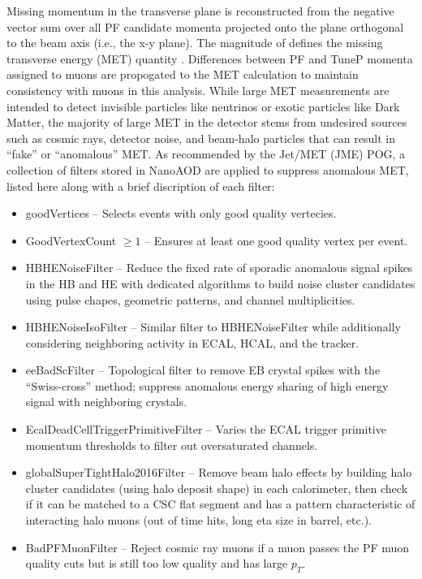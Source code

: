Missing momentum in the transverse plane \ptvecmiss is reconstructed from the negative vector sum over all PF candidate momenta projected onto the plane orthogonal to the beam axis (i.e., the x-y plane). The magnitude of \ptvecmiss defines the missing transverse energy (MET) quantity \MET. Differences between PF and TuneP momenta assigned to muons are propogated to the MET calculation to maintain consistency with muons in this analysis. While large MET measurements are intended to detect invisible particles like neutrinos or exotic particles like Dark Matter, the majority of large MET in the detector stems from undesired sources such as cosmic rays, detector noise, and beam-halo particles that can result in ``fake'' or ``anomalous'' MET. As recommended by the Jet/MET (JME) POG, a collection of filters stored in NanoAOD are applied to suppress anomalous MET, listed here along with a brief discription of each filter:

\begin{itemize}
    \item {goodVertices} -- Selects events with only good quality vertecies.
    \item {GoodVertexCount} $\geq 1$ -- Ensures at least one good quality vertex per event.
    \item {HBHENoiseFilter} -- Reduce the fixed rate of sporadic anomalous signal spikes in the HB and HE with dedicated algorithms to build noise cluster candidates using pulse chapes, geometric patterns, and channel multiplicities.
    \item {HBHENoiseIsoFilter} -- Similar filter to HBHENoiseFilter while additionally considering neighboring activity in ECAL, HCAL, and the tracker.
    \item {eeBadScFilter} -- Topological filter to remove EB crystal spikes with the ``Swiss-cross'' method; suppress anomalous energy sharing of high energy signal with neighboring crystals.
    \item {EcalDeadCellTriggerPrimitiveFilter} -- Varies the ECAL trigger primitive momentum thresholds to filter out oversaturated channels.
    \item {globalSuperTightHalo2016Filter} -- Remove beam halo effects by building halo cluster candidates (using halo deposit shape) in each calorimeter, then check if it can be matched to a CSC flat segment and has a pattern characteristic of interacting halo muons (out of time hits, long eta size in barrel, etc.).
    \item {BadPFMuonFilter} -- Reject cosmic ray muons if a muon passes the PF muon quality cuts but is still too low quality and has large $p_T$.
\end{itemize}
